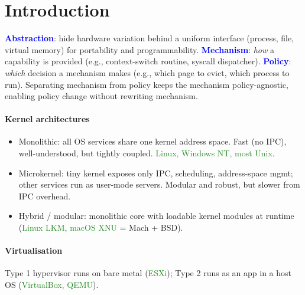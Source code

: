 \section{Introduction}
\textcolor{Blue}{\textbf{Abstraction}}: hide hardware variation behind a uniform interface (process, file, virtual memory) for portability and programmability.
\textcolor{Blue}{\textbf{Mechanism}}: \emph{how} a capability is provided (e.g., context-switch routine, syscall dispatcher).
\textcolor{Blue}{\textbf{Policy}}: \emph{which} decision a mechanism makes (e.g., which page to evict, which process to run).
Separating mechanism from policy keeps the mechanism \textcolor{Bittersweet}{policy-agnostic}, enabling policy change without rewriting mechanism.

\paragraph{Kernel architectures}
\begin{itemize}
  \item \textcolor{Bittersweet}{Monolithic}: all OS services share one kernel address space. Fast (no IPC), well-understood, but tightly coupled. \textcolor{ForestGreen}{Linux, Windows NT, most Unix}.
  \item \textcolor{Bittersweet}{Microkernel}: tiny kernel exposes only IPC, scheduling, address-space mgmt; other services run as user-mode servers. Modular and robust, but slower from IPC overhead.
  \item \textcolor{Bittersweet}{Hybrid / modular}: monolithic core with loadable kernel modules at runtime (\textcolor{ForestGreen}{Linux LKM}, \textcolor{ForestGreen}{macOS XNU} = Mach + BSD).
\end{itemize}

\paragraph{Virtualisation}
\textcolor{Bittersweet}{Type 1 hypervisor} runs on bare metal (\textcolor{ForestGreen}{ESXi}); \textcolor{Bittersweet}{Type 2} runs as an app in a host OS (\textcolor{ForestGreen}{VirtualBox, QEMU}).
